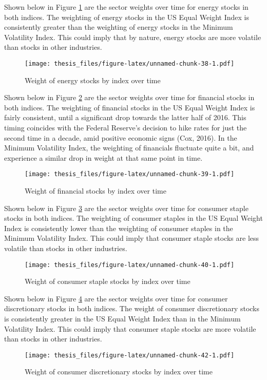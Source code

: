 \documentclass[12pt,twoside]{reedthesis}
\theoremstyle{definition}
\theoremstyle{definition}
\theoremstyle{definition}
\theoremstyle{remark}
\begin{document}
Shown below in Figure \ref{fig:sector1} are the sector weights over time
for energy stocks in both indices. The weighting of energy stocks in the
US Equal Weight Index is consistently greater than the weighting of
energy stocks in the Minimum Volatility Index. This could imply that by
nature, energy stocks are more volatile than stocks in other industries.
\begin{figure}[htbp]
\centering
\texttt{[image: thesis\_files/figure-latex/unnamed-chunk-38-1.pdf]}
\caption{\label{fig:unnamed-chunk-38}Weight of energy stocks by index over
time\label{fig:sector1}}
\end{figure}
\clearpage
Shown below in Figure \ref{fig:sector2} are the sector weights over time
for financial stocks in both indices. The weighting of financial stocks
in the US Equal Weight Index is fairly consistent, until a significant
drop towards the latter half of 2016. This timing coincides with the
Federal Reserve's decision to hike rates for just the second time in a
decade, amid positive economic signs (Cox, 2016). In the Minimum
Volatility Index, the weighting of financials fluctuate quite a bit, and
experience a similar drop in weight at that same point in time.
\begin{figure}[htbp]
\centering
\texttt{[image: thesis\_files/figure-latex/unnamed-chunk-39-1.pdf]}
\caption{\label{fig:unnamed-chunk-39}Weight of financial stocks by index
over time\label{fig:sector2}}
\end{figure}
Shown below in Figure \ref{fig:sector3} are the sector weights over time
for consumer staple stocks in both indices. The weighting of consumer
staples in the US Equal Weight Index is consistently lower than the
weighting of consumer staples in the Minimum Volatility Index. This
could imply that consumer staple stocks are less volatile than stocks in
other industries.
\begin{figure}[htbp]
\centering
\texttt{[image: thesis\_files/figure-latex/unnamed-chunk-40-1.pdf]}
\caption{\label{fig:unnamed-chunk-40}Weight of consumer staple stocks by
index over time\label{fig:sector3}}
\end{figure}
\clearpage
Shown below in Figure \ref{fig:sector4} are the sector weights over time
for consumer discretionary stocks in both indices. The weight of
consumer discretionary stocks is consistently greater in the US Equal
Weight Index than in the Minimum Volatility Index. This could imply that
consumer staple stocks are more volatile than stocks in other
industries.
\begin{figure}[htbp]
\centering
\texttt{[image: thesis\_files/figure-latex/unnamed-chunk-42-1.pdf]}
\caption{\label{fig:unnamed-chunk-42}Weight of consumer discretionary stocks
by index over time\label{fig:sector4}}
\end{figure}
\end{document}
